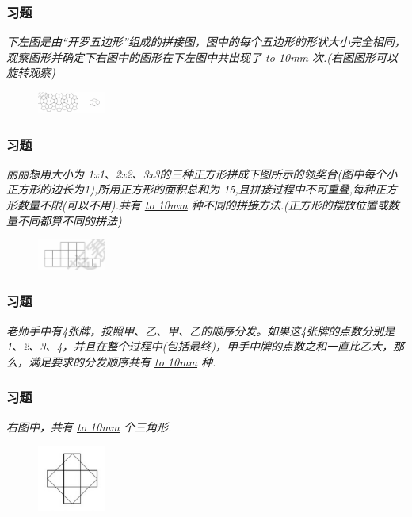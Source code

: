\begin{frame}
    \frametitle{习题\theframecounter}
    \textit{下左图是由“开罗五边形”组成的拼接图，图中的每个五边形的形状大小完全相同，观察图形并确定下右图中的图形在下左图中共出现了 \underline{\hbox to 10mm{}} 次.(右图图形可以旋转观察)}
    \begin{figure}[H] 
        \centering
        \includegraphics[width=0.2\textwidth]{./pics/Chapter_6/8.png}
    \end{figure}
\end{frame}

\begin{frame}
    \frametitle{习题\theframecounter}
    \textit{丽丽想用大小为 1x1、2x2、3x3的三种正方形拼成下图所示的领奖台(图中每个小正方形的边长为1),所用正方形的面积总和为 15,且拼接过程中不可重叠,每种正方形数量不限(可以不用).共有 \underline{\hbox to 10mm{}} 种不同的拼接方法.(正方形的摆放位置或数量不同都算不同的拼法)}
    \begin{figure}[H] 
        \centering
        \includegraphics[width=0.2\textwidth]{./pics/Chapter_6/9.png}
    \end{figure}
\end{frame}


\begin{frame}
    \frametitle{习题\theframecounter}
    \textit{老师手中有4张牌，按照甲、乙、甲、乙的顺序分发。如果这4张牌的点数分别是 1、2、3、4，并且在整个过程中(包括最终)，甲手中牌的点数之和一直比乙大，那么，满足要求的分发顺序共有 \underline{\hbox to 10mm{}} 种.}
\end{frame}

\begin{frame}
    \frametitle{习题\theframecounter}
    \textit{右图中，共有 \underline{\hbox to 10mm{}} 个三角形.}
    \begin{figure}[H] 
        \centering
        \includegraphics[width=0.2\textwidth]{./pics/Chapter_6/12.png}
    \end{figure}
\end{frame}

